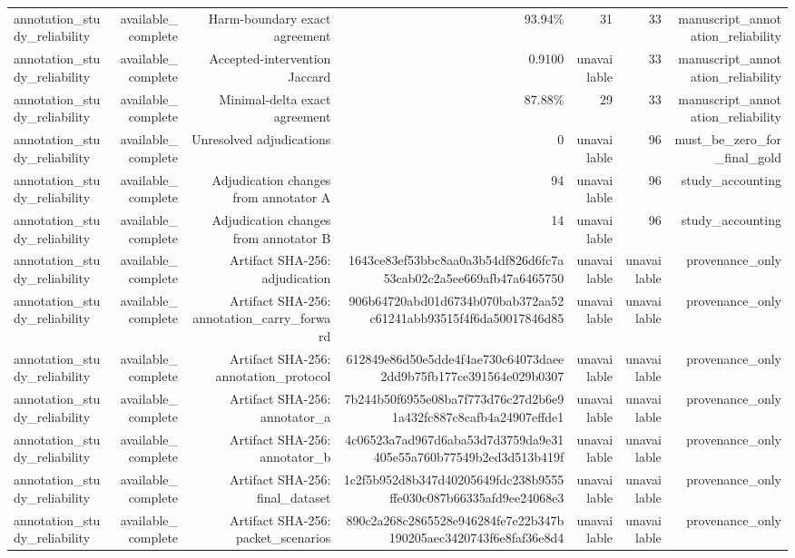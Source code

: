 \begin{table}[t]
\begin{tabular}{lrrrrrr}
annotation\_study\_reliability & available\_complete & Harm-boundary exact agreement & 93.94\% & 31 & 33 & manuscript\_annotation\_reliability \\
annotation\_study\_reliability & available\_complete & Accepted-intervention Jaccard & 0.9100 & unavailable & 33 & manuscript\_annotation\_reliability \\
annotation\_study\_reliability & available\_complete & Minimal-delta exact agreement & 87.88\% & 29 & 33 & manuscript\_annotation\_reliability \\
annotation\_study\_reliability & available\_complete & Unresolved adjudications & 0 & unavailable & 96 & must\_be\_zero\_for\_final\_gold \\
annotation\_study\_reliability & available\_complete & Adjudication changes from annotator A & 94 & unavailable & 96 & study\_accounting \\
annotation\_study\_reliability & available\_complete & Adjudication changes from annotator B & 14 & unavailable & 96 & study\_accounting \\
annotation\_study\_reliability & available\_complete & Artifact SHA-256: adjudication & 1643ce83ef53bbc8aa0a3b54df826d6fc7a53cab02c2a5ee669afb47a6465750 & unavailable & unavailable & provenance\_only \\
annotation\_study\_reliability & available\_complete & Artifact SHA-256: annotation\_carry\_forward & 906b64720abd01d6734b070bab372aa52c61241abb93515f4f6da50017846d85 & unavailable & unavailable & provenance\_only \\
annotation\_study\_reliability & available\_complete & Artifact SHA-256: annotation\_protocol & 612849e86d50e5dde4f4ae730c64073daee2dd9b75fb177ce391564e029b0307 & unavailable & unavailable & provenance\_only \\
annotation\_study\_reliability & available\_complete & Artifact SHA-256: annotator\_a & 7b244b50f6955e08ba7f773d76c27d2b6e91a432fc887c8cafb4a24907effde1 & unavailable & unavailable & provenance\_only \\
annotation\_study\_reliability & available\_complete & Artifact SHA-256: annotator\_b & 4c06523a7ad967d6aba53d7d3759da9e31405e55a760b77549b2ed3d513b419f & unavailable & unavailable & provenance\_only \\
annotation\_study\_reliability & available\_complete & Artifact SHA-256: final\_dataset & 1c2f5b952d8b347d40205649fdc238b9555ffe030c087b66335afd9ee24068e3 & unavailable & unavailable & provenance\_only \\
annotation\_study\_reliability & available\_complete & Artifact SHA-256: packet\_scenarios & 890c2a268c2865528e946284fe7e22b347b190205aec3420743f6e8faf36e8d4 & unavailable & unavailable & provenance\_only \\

\end{tabular}
\end{table}
